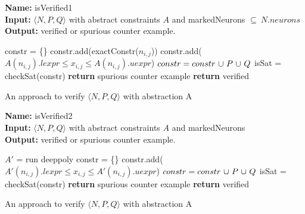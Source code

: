 \begin{algorithm}[t]
  \textbf{Name: } isVerified1 \\
  \textbf{Input: } $\langle N,P,Q \rangle$ with abstract constraints $A$ and markedNeurons $\subseteq ~ N.neurons$ \\
  \textbf{Output: } verified or spurious counter example. 
  \begin{algorithmic}[1]
    \State constr = \{\}
          \State constr.add(exactConstr($n_{i,j}$)) 
        \Else
          \State constr.add($A(n_{i,j}).lexpr \leq x_{i,j} \leq A(n_{i,j}).uexpr$)
        \EndIf
      \EndFor
    \EndFor
    \State $constr = constr ~ {\cup} ~ P ~ {\cup} ~ Q$
    \State isSat = checkSat(constr)
      \State \textbf{return} spurious counter example
    \Else
      \State \textbf{return} verified
    \EndIf
  \end{algorithmic}
  \caption{An approach to verify $\langle N,P,Q \rangle$ with abstraction A}
  \label{algo:verif1}
\end{algorithm}

\begin{algorithm}[t]
  \textbf{Name: } isVerified2 \\
  \textbf{Input: } $\langle N,P,Q \rangle$ with abstract constraints $A$ and markedNeurons \\
  \textbf{Output: } verified or spurious counter example. 
  \begin{algorithmic}[1]
      \State $A'$ = run deeppoly
        \State constr = \{\}
            \State constr.add($A'(n_{i,j}).lexpr \leq x_{i,j} \leq A'(n_{i,j}).uexpr$)
          \EndFor
        \EndFor
        \State $constr = constr ~ {\cup} ~ P ~ {\cup} ~ Q$ 
        \State isSat = checkSat(constr)
          \State \textbf{return} spurious counter example
        \EndIf
      \EndIf
    \EndFor
    \State \textbf{return} verified
  \end{algorithmic}
  \caption{An approach to verify $\langle N,P,Q \rangle$ with abstraction A}
  \label{algo:verif2}
\end{algorithm}



